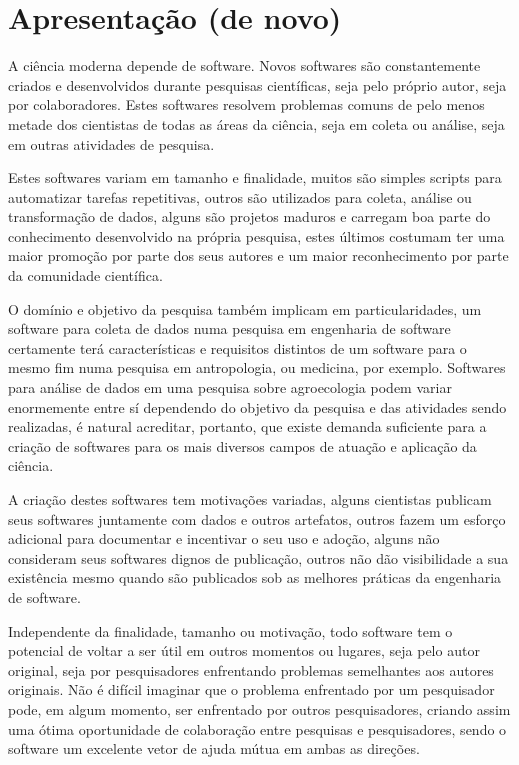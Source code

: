
\section{Apresentação (de novo)}

A ciência moderna depende de software. Novos softwares são constantemente
criados e desenvolvidos durante pesquisas científicas, seja pelo próprio autor,
seja por colaboradores. Estes softwares resolvem
problemas comuns de pelo menos metade dos cientistas de todas as áreas da
ciência, seja em coleta ou análise, seja em outras atividades de pesquisa.

Estes softwares variam em tamanho e finalidade, muitos são simples
scripts para automatizar tarefas repetitivas, outros são utilizados para
coleta, análise ou transformação de dados, alguns são projetos maduros e
carregam boa parte do conhecimento desenvolvido na própria pesquisa, estes
últimos costumam ter uma maior promoção por parte dos seus autores e um maior
reconhecimento por parte da comunidade científica.

O domínio e objetivo da pesquisa também implicam em particularidades,
um software para coleta de dados numa pesquisa em engenharia de
software certamente terá características e requisitos distintos de um software
para o mesmo fim numa pesquisa em antropologia, ou medicina, por exemplo.
Softwares para análise de dados em uma pesquisa sobre agroecologia podem variar
enormemente entre sí dependendo do objetivo da pesquisa e das atividades sendo
realizadas, é natural acreditar, portanto, que existe demanda suficiente para a
criação de softwares para os mais diversos campos de atuação e aplicação da
ciência.

A criação destes softwares tem motivações variadas, alguns cientistas publicam
seus softwares juntamente com dados e outros artefatos, outros fazem um esforço
adicional para documentar e incentivar o seu uso e adoção, alguns não
consideram seus softwares dignos de publicação, outros não dão visibilidade a
sua existência mesmo quando são publicados sob as melhores práticas da
engenharia de software.

Independente da finalidade, tamanho ou motivação, todo software tem o potencial
de voltar a ser útil em outros momentos ou lugares, seja pelo autor original,
seja por pesquisadores enfrentando problemas semelhantes aos autores originais.
Não é difícil imaginar que o problema enfrentado por um pesquisador pode, em
algum momento, ser enfrentado por outros pesquisadores, criando assim uma ótima
oportunidade de colaboração entre pesquisas e pesquisadores, sendo o software
um excelente vetor de ajuda mútua em ambas as direções.

